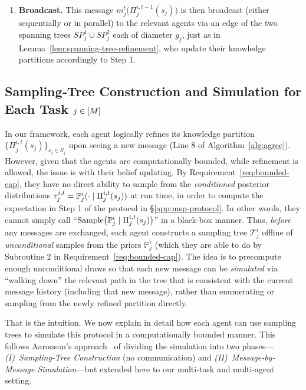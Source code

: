 \begin{enumerate}
\item \textbf{Broadcast.}
  This message $m^t_j\bigl(\Pi_j^{i,t-1}(s_j)\bigr)$ is then broadcast (either sequentially or in parallel) to the relevant agents via an edge of the two spanning trees ${SP}^1_j\cup{SP}^2_j$ each of diameter $g_j$, just as in Lemma~\ref{lem:spanning-tree-refinement}, who update their knowledge partitions accordingly to Step 1.
\end{enumerate}

\subsection{Sampling‐Tree Construction and Simulation for Each Task \texorpdfstring{$j\in[M]$}{}}
\label{app:sampling-tree}
In our framework, each agent logically refines its knowledge partition $\{\Pi_j^{i,t}(s_j)\}_{s_j \in S_j}$ upon seeing a new message (Line 8 of Algorithm~\ref{alg:agree}).
However, given that the agents are computationally bounded, while refinement is allowed, the issue is with their belief updating.
By Requirement~\ref{req:bounded-cap}, they have no direct ability to sample from the \emph{conditioned} posterior distributions $\tau^{i,t}_j = \mathbb{P}^i_j(\cdot \mid \Pi_j^{i,t}(s_j))$ at run time, in order to compute the expectation in Step 1 of the protocol in \S\ref{app:msp-protocol}.
In other words, they cannot simply call ``$\mathrm{Sample}\bigl(\mathbb{P}^i_j\mid \Pi_j^{i,t}(s_j)\bigr)$'' in a black‐box manner. 
Thus, \emph{before} any messages are exchanged, each agent constructs a sampling tree $\mathcal{T}^{i}_{j}$ offline of \emph{unconditional} samples from the priors $\mathbb{P}^{i}_{j}$ (which they are able to do by Subroutine 2 in Requirement~\ref{req:bounded-cap}).
The idea is to precompute enough unconditional draws so that each new message can be \emph{simulated} via ``walking down'' the relevant path in the tree that is consistent with the current message history (including that new message), rather than enumerating or sampling from the newly refined partition directly.

That is the intuition. 
We now explain in detail how each agent can use sampling trees to simulate this protocol in a computationally bounded manner. 
This follows Aaronson's approach~\citep[\S 4.2]{aaronson2005complexity} of dividing the simulation into two phases---\emph{(I)~Sampling‐Tree Construction} (no communication) 
and \emph{(II)~Message‐by‐Message Simulation}---but extended here to our 
multi‐task and multi-agent setting.

